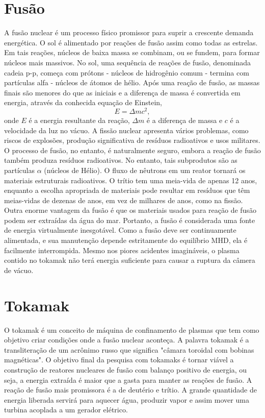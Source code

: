 \documentclass[12pt,oneside,a4paper]{abntex2}
\begin{document}
\section{Fusão} 
\noindent A fusão nuclear é um processo físico promissor para suprir a crescente demanda energética. 
O sol é alimentado por reações de fusão assim como todas as estrelas. 
Em tais reações, núcleos de baixa massa se combinam, ou se fundem, para formar núcleos mais massivos. 
No sol, uma sequência de reações de fusão, denominada cadeia p-p, começa com prótons - núcleos de hidrogênio comum - termina com partículas alfa - núcleos de átomos de hélio. Após uma reação de fusão, as massas finais são menores do que as iniciais e a diferença de massa é convertida em energia, através da conhecida equação de Einstein,
$$ E = \Delta m c^2 ,$$ 
onde $E$ é a energia resultante da reação, $\Delta m$ é a diferença de massa e $c$ é a velocidade da luz no vácuo. 
A fissão nuclear apresenta vários problemas, como riscos de explosões, produção significativa de resíduos radioativos e usos militares. 
O processo de fusão, no entanto, é naturalmente seguro, embora a reação de fusão também produza resíduos radioativos. No entanto, tais subprodutos são as partículas $\alpha$ (núcleos de Hélio). 
O fluxo de nêutrons em um reator tornará os materiais estruturais radioativos. 
O trítio tem uma meia-vida de apenas 12 anos, enquanto a escolha apropriada de materiais pode resultar em resíduos que têm meias-vidas de dezenas de anos, em vez de milhares de anos, como na fissão. 
Outra enorme vantagem da fusão é que os materiais usados para reação de fusão podem ser extraídas da água do mar. 
Portanto, a fusão é considerada uma fonte de energia virtualmente inesgotável. 
Como a fusão deve ser continuamente alimentada, e sua manutenção depende estritamente do equilíbrio MHD, ela é facilmente interrompida. 
Mesmo nos piores acidentes imagináveis, o plasma contido no tokamak não terá energia suficiente para causar a ruptura da câmera de vácuo.

\section{Tokamak} 
\noindent O tokamak é um conceito de máquina de confinamento de plasmas que tem como objetivo criar condições onde a fusão nuclear aconteça. 
A palavra tokamak é a transliteração de um acrônimo russo que significa "câmara toroidal com bobinas magnéticas". 
O objetivo final da pesquisa com tokamaks é tornar viável a construção de reatores nucleares de fusão com balanço positivo de energia, ou seja, a energia extraída é maior que a gasta para manter as reações de fusão. 
A reação de fusão mais promissora é a de deutério e trítio. 
A grande quantidade de energia liberada servirá para aquecer água, produzir vapor e assim mover uma turbina acoplada a um gerador elétrico. 
\end{document}
